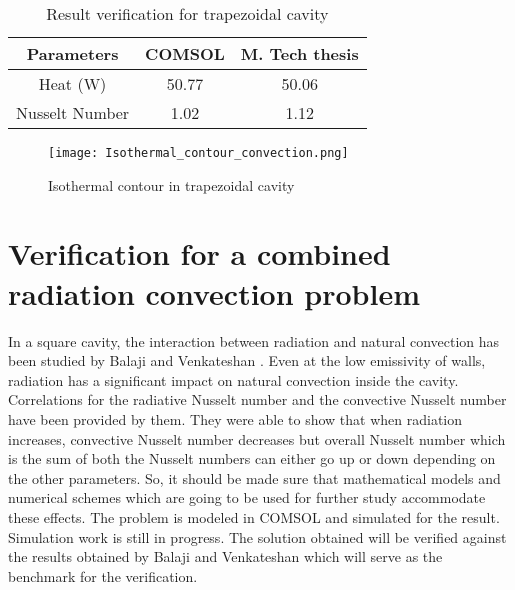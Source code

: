 \begin{table}[H]
\centering
\caption{Result verification for trapezoidal cavity}
\label{tab:conv trapz cavity}
\begin{tabular}{|c|c|c|}
\hline
\textbf{Parameters} & \textbf{COMSOL} & \textbf{M. Tech thesis} \\ \hline
Heat (W)                                    & 50.77           & 50.06                   \\ \hline
Nusselt Number                              & 1.02            & 1.12                    \\ \hline
\end{tabular}
\end{table}


\begin{figure}[H]
\begin{center}
\texttt{[image: Isothermal\_contour\_convection.png]}
\caption{Isothermal contour in trapezoidal cavity}
\label{fig:isotherms trapz cavity}
\end{center}
\end{figure}



\section{Verification for a combined radiation convection problem}
In a square cavity, the interaction between radiation and natural convection has been studied by Balaji and Venkateshan \citep{BALAJI1994249}. Even at the low emissivity of walls, radiation has a significant impact on natural convection inside the cavity. Correlations for the radiative Nusselt number and the convective Nusselt number have been provided by them. They were able to show that when radiation increases, convective Nusselt number decreases but overall Nusselt number which is the sum of both the Nusselt numbers can either go up or down depending on the other parameters. So, it should be made sure that mathematical models and numerical schemes which are going to be used for further study accommodate these effects. The problem is modeled in COMSOL and simulated for the result. Simulation work is still in progress. The solution obtained will be verified against the results obtained by Balaji and Venkateshan \citep{BALAJI1994249} which will serve as the benchmark for the verification.
